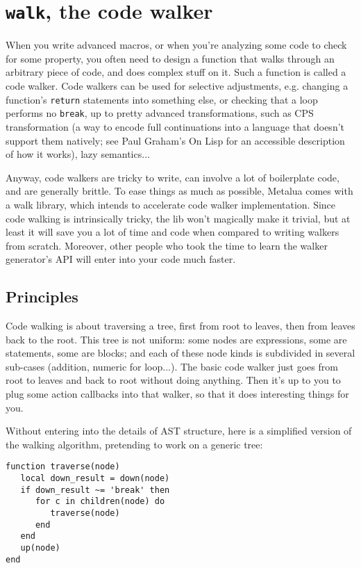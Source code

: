 \section{{\tt walk}, the code walker}

When you write advanced macros, or when you're analyzing some code to check for
some property, you often need to design a function that walks through an
arbitrary piece of code, and does complex stuff on it. Such a function is called
a code walker. Code walkers can be used for selective adjustments, e.g.
changing a function's {\tt return} statements into something else, or checking
that a loop performs no {\tt break}, up to pretty advanced transformations, such
as CPS transformation (a way to encode full continuations into a language that
doesn't support them natively; see Paul Graham's On Lisp for an accessible
description of how it works), lazy semantics...

Anyway, code walkers are tricky to write, can involve a lot of boilerplate code,
and are generally brittle. To ease things as much as possible, Metalua comes
with a walk library, which intends to accelerate code walker implementation.
Since code walking is intrinsically tricky, the lib won't magically make it
trivial, but at least it will save you a lot of time and code when compared to
writing walkers from scratch. Moreover, other people who took the time to
learn the walker generator's API will enter into your code much faster.

\subsection{Principles}

Code walking is about traversing a tree, first from root to leaves, then from
leaves back to the root. This tree is not uniform: some nodes are expressions,
some are statements, some are blocks; and each of these node kinds is
subdivided in several sub-cases (addition, numeric for loop...). The basic code
walker just goes from root to leaves and back to root without doing anything.
Then it's up to you to plug some action callbacks into that walker, so that it
does interesting things for you.

Without entering into the details of AST structure, here is a simplified version
of the walking algorithm, pretending to work on a generic tree:

\begin{verbatim}
function traverse(node)
   local down_result = down(node)
   if down_result ~= 'break' then 
      for c in children(node) do
         traverse(node)
      end
   end
   up(node)
end
\end{verbatim}

